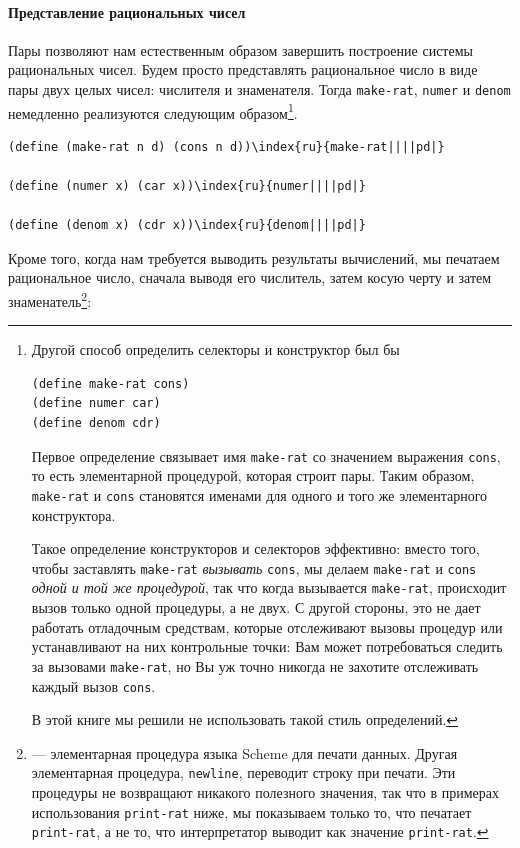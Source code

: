 \paragraph{Представление рациональных чисел}


Пары позволяют нам естественным образом завершить построение
системы рациональных чисел. Будем просто представлять рациональное
число в виде пары двух целых чисел: числителя и знаменателя.  Тогда
{\tt make-rat}, {\tt numer} и {\tt denom}
немедленно реализуются следующим образом\footnote{Другой способ определить селекторы и конструктор был
бы
\begin{Verbatim}
(define make-rat cons)
(define numer car)
(define denom cdr)
\end{Verbatim}
Первое определение связывает имя {\tt make-rat} со значением
выражения {\tt cons}, то есть элементарной процедурой, которая
строит пары.  Таким образом, {\tt make-rat} и {\tt cons} 
становятся именами для одного и того же элементарного конструктора.

Такое определение конструкторов и селекторов
эффективно: вместо того, чтобы заставлять {\tt make-rat}
{\em вызывать} {\tt cons}, мы делаем
{\tt make-rat} и {\tt cons} {\em одной и той же
процедурой}, так что когда вызывается {\tt make-rat},
происходит вызов только одной процедуры, а не двух.  С другой стороны, 
это не дает работать отладочным средствам, которые отслеживают вызовы процедур
или устанавливают на них контрольные точки: Вам может потребоваться
следить за вызовами {\tt make-rat}, но Вы уж точно никогда не
захотите отслеживать каждый вызов {\tt cons}.

В этой книге мы решили не использовать такой стиль
определений.}.

\begin{Verbatim}[fontsize=\footnotesize]
(define (make-rat n d) (cons n d))\index{ru}{make-rat||||pd|}

(define (numer x) (car x))\index{ru}{numer||||pd|}

(define (denom x) (cdr x))\index{ru}{denom||||pd|}
\end{Verbatim}
Кроме того, когда нам требуется выводить результаты вычислений,
мы 
печатаем рациональное число, сначала выводя его числитель, затем   
косую черту и затем знаменатель\footnote{
--- элементарная процедура языка
Scheme для печати данных.  Другая элементарная процедура,
{\tt newline},
переводит строку при печати.  Эти
процедуры не возвращают никакого полезного значения, так что в примерах 
использования {\tt print-rat} ниже, мы показываем только то,
что печатает {\tt print-rat}, а не то, что интерпретатор
выводит как значение {\tt print-rat}.}:%

